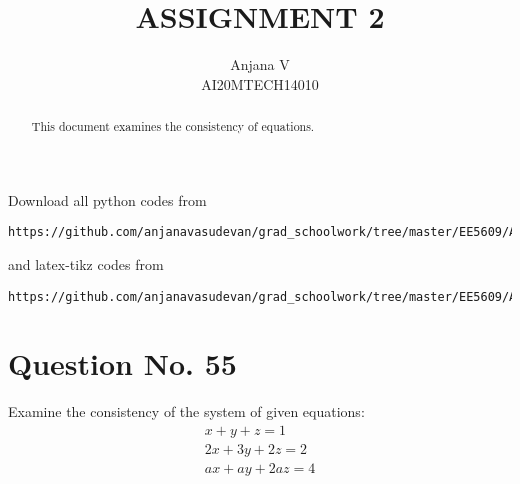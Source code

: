 \documentclass[journal,12pt,twocolumn]{IEEEtran}
\title{ASSIGNMENT 2}
\author{Anjana V\\AI20MTECH14010 }
\begin{document}
\makeatletter
\renewcommand*\env@matrix[1][*\c@MaxMatrixCols c]{%
  \hskip -\arraycolsep
  \let\@ifnextchar\new@ifnextchar
  \array{#1}}
\makeatother
\newcommand{\myvec}[1]{\ensuremath{\begin{pmatrix}#1\end{pmatrix}}}
\newcommand{\BAR}{%
  \hspace{-\arraycolsep}%
  \strut\vrule %
  \hspace{-\arraycolsep}%
}
\renewcommand{\vec}[1]{\mathbf{#1}}
\maketitle
\begin{abstract}
This document examines the consistency of equations.
\end{abstract}
Download all python codes from 
%
\begin{lstlisting}
https://github.com/anjanavasudevan/grad_schoolwork/tree/master/EE5609/Assignment2
\end{lstlisting}
%
and latex-tikz codes from 
%
\begin{lstlisting}
https://github.com/anjanavasudevan/grad_schoolwork/tree/master/EE5609/Assignment2/latex
\end{lstlisting}
%
\section{Question No. 55}
Examine the consistency of the system of given equations:
\begin{align}
		x+y+z =1 
		\\2x+3y+2z = 2
		\\ax+ay+2az = 4
\end{align}
\end{document}
